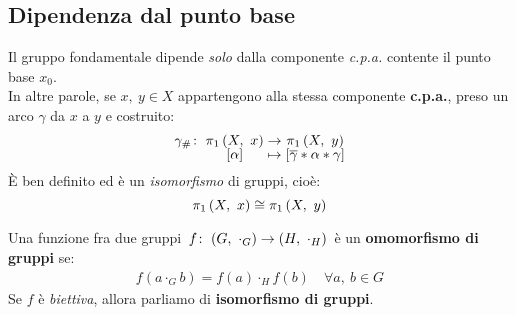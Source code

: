 \subsection{Dipendenza dal punto base}
\begin{theorema}
	Il gruppo fondamentale dipende \textit{solo} dalla componente \textit{c.p.a.} contente il punto base $x_0$.\\
	In altre parole, se $x,\ y\in X$ appartengono alla stessa componente \textbf{c.p.a.}, preso un arco $\gamma$ da $x$ a $y$ e costruito:
	\begin{equation}
		\funztot{\gamma_{\#}}{\gruf{X}{x}}{\gruf{X}{y}}{\left[\alpha\right]}{\left[\overline{\gamma}\ast\alpha\ast\gamma\right]}
	\end{equation}
	È ben definito ed è un \textit{isomorfismo} di gruppi, cioè:
	\begin{equation}
		\gruf{X}{x}\cong\gruf{X}{y}
	\end{equation}
\end{theorema}
\begin{remember}
	Una funzione fra due gruppi $\funz{f}{\left(G,\ \cdot_G\right)}{\left(H,\ \cdot_H\right)}$ è un \textbf{omomorfismo di gruppi} se:
	\begin{gather*}
		f\left(a\cdot_G b\right)=f\left(a\right)\cdot_H f\left(b\right)\quad \forall a,\ b\in G
	\end{gather*}
	Se $f$ è \textit{biettiva}, allora parliamo di \textbf{isomorfismo di gruppi}.
\end{remember}

